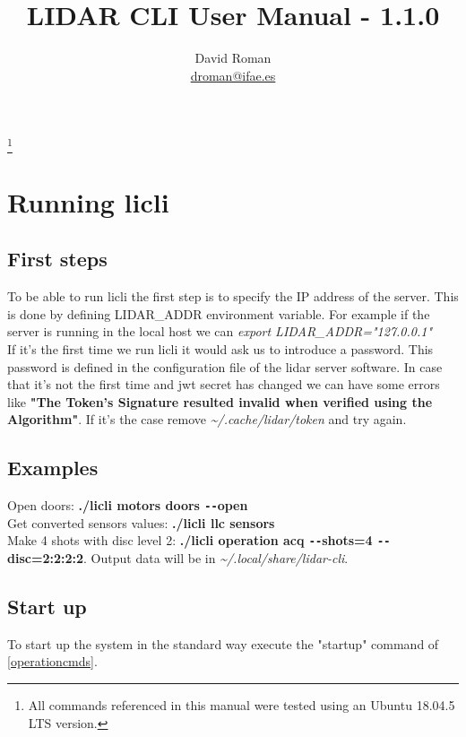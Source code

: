 \documentclass[letterpaper, 10 pt]{article}
\begin{document}
\title{LIDAR CLI User Manual - 1.1.0}
\author{David Roman \\  \href{mailto:droman@ifae.es}{droman@ifae.es} }
\maketitle
\footnote{All commands referenced in this manual were tested using an Ubuntu 18.04.5 LTS version. }
\pagestyle{empty}
\newpage
\tableofcontents
\newpage
{}
\pagestyle{plain}

\section{Running licli}
\subsection{First steps}
To be able to run licli the first step is to specify the IP address of the server. This is done by defining LIDAR\_ADDR environment variable. For example if the server is running in the local host we can \emph{export LIDAR\_ADDR="127.0.0.1"}\\
\linebreak
If it's the first time we run licli it would ask us to introduce a password. This password is defined in the configuration file of the lidar server software. 
In case that it's not the first time and jwt secret has changed we can have some errors like \textbf{"The Token's Signature resulted invalid when verified using the Algorithm"}. If it's the case remove \textit{\~{}/.cache/lidar/token} and try again.\\

\subsection{Examples}

Open doors: \textbf{./licli motors doors \texttt{-{}-}open}\\
Get converted sensors values: \textbf{./licli llc sensors}\\
Make 4 shots with disc level 2: \textbf{./licli operation acq \texttt{-{}-}shots=4 \texttt{-{}-}disc=2:2:2:2}. Output data will be in \textit{\~{}/.local/share/lidar-cli}.

\subsection{Start up}
To start up the system in the standard way execute the "startup" command of \ref{operationcmds}.\\
\end{document}
